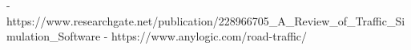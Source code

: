 
\begin{thebibliography}{x}

- https://www.researchgate.net/publication/228966705_A_Review_of_Traffic_Simulation_Software
- https://www.anylogic.com/road-traffic/

\end{thebibliography}
